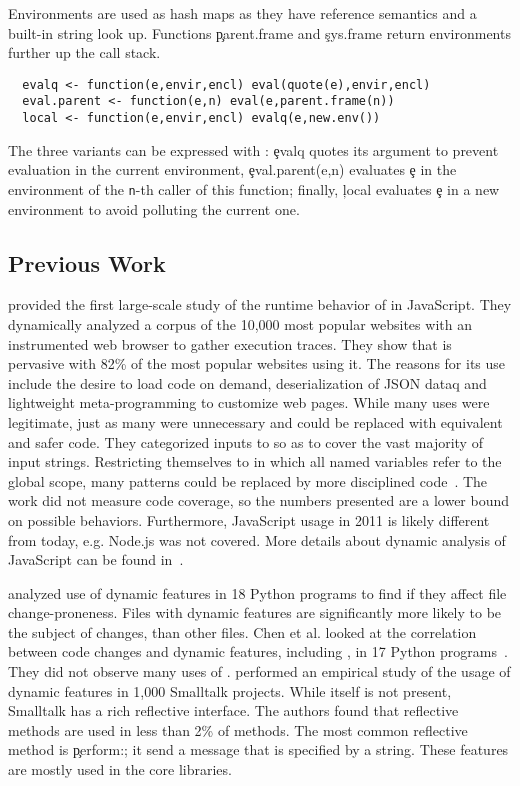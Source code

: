 \documentclass[review,nonacm,screen,acmsmall,anonymous=true]{acmart}
\begin{document}
\noindent Environments are used as hash maps as they have reference semantics
and a built-in string look up. Functions \c{parent.frame} and \c{sys.frame}
return environments further up the call stack.
 \begin{lstlisting}
  evalq <- function(e,envir,encl) eval(quote(e),envir,encl)
  eval.parent <- function(e,n) eval(e,parent.frame(n))
  local <- function(e,envir,encl) evalq(e,new.env())
\end{lstlisting}
The three variants can be expressed with \eval: \c{evalq} quotes its
argument to prevent evaluation in the current environment,
\c{eval.parent(e,n)} evaluates \c{e} in the environment of the {\tt n}-th
caller of this function; finally, \c{local} evaluates \c{e} in a new environment
to avoid polluting the current one.

\subsection{Previous Work}

\citet{ecoop11} provided the first large-scale study of the runtime behavior of
\eval in JavaScript. They dynamically analyzed a corpus of the 10,000 most
popular websites with an instrumented web browser to gather execution traces.
They show that \eval is pervasive with 82\% of the most popular websites using
it. The reasons for its use include the desire to load code on demand,
deserialization of JSON dataq and lightweight meta-programming to customize web
pages. While many uses were legitimate, just as many were unnecessary and could
be replaced with equivalent and safer code. They categorized inputs to \eval so
as to cover the vast majority of input strings. Restricting themselves to \eval
in which all named variables refer to the global scope, many patterns could be
replaced by more disciplined code~\cite{oopsla12b, moller12}. The work did not
measure code coverage, so the numbers presented are a lower bound on possible
behaviors. Furthermore, JavaScript usage in 2011 is likely different from today,
e.g. Node.js was not covered. More details about dynamic analysis of JavaScript
can be found in~\cite{liang}.

\citet{wang} analyzed use of dynamic features in 18 Python programs to find if
they affect file change-proneness. Files with dynamic features are significantly
more likely to be the subject of changes, than other files. Chen et al. looked
at the correlation between code changes and dynamic features, including \eval,
in 17 Python programs~\cite{chen}. They did not observe many uses of \eval.
\citet{oscar} performed an empirical study of the usage of dynamic features in
1,000 Smalltalk projects. While \eval itself is not present, Smalltalk has a
rich reflective interface. The authors found that reflective methods are used in less
than 2\% of methods. The most common reflective method is \c{perform:}; it send
a message that is specified by a string. These features are mostly used in the
core libraries.
\end{document}
